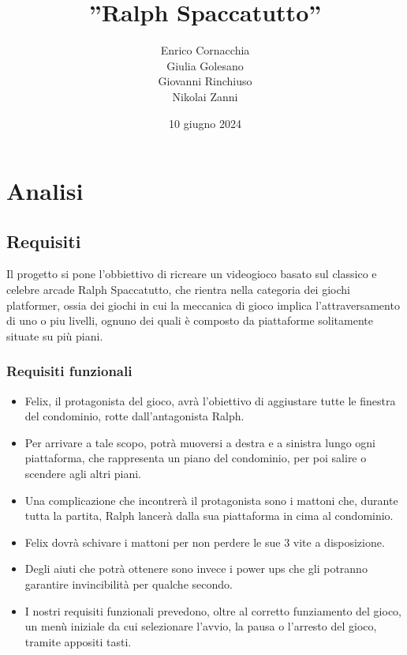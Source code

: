 \documentclass[a4paper,12pt]{report}
\title{''Ralph Spaccatutto''}
\author{Enrico Cornacchia \\ Giulia Golesano \\ Giovanni Rinchiuso \\ Nikolai Zanni}
\date{10 giugno 2024}
\begin{document}
\maketitle

\tableofcontents

\chapter{Analisi}

\section{Requisiti}

Il progetto si pone l'obbiettivo di ricreare un videogioco basato sul classico e celebre arcade Ralph Spaccatutto, che rientra nella categoria dei giochi platformer, ossia dei giochi in cui la meccanica di gioco implica l'attraversamento di uno o piu livelli, ognuno dei quali è composto da piattaforme solitamente situate su più piani.

\subsection{Requisiti funzionali}

\begin{itemize}

	\item Felix, il protagonista del gioco, avrà l'obiettivo di aggiustare tutte le finestra del condominio, rotte dall'antagonista Ralph. 
	\item Per arrivare a tale scopo, potrà muoversi a destra e a sinistra lungo ogni piattaforma, che rappresenta un piano del condominio, per poi salire o scendere agli altri piani.
	\item Una complicazione che incontrerà il protagonista sono i mattoni che, durante tutta la partita, Ralph lancerà dalla sua piattaforma in cima al condominio.
 \item Felix  dovrà schivare i mattoni per non perdere le sue 3 vite a disposizione.
	\item Degli aiuti che potrà ottenere sono invece i power ups che gli potranno garantire invincibilità per qualche secondo.
	\item I nostri requisiti funzionali prevedono, oltre al corretto funziamento del gioco, un menù iniziale da cui selezionare l'avvio, la pausa o l'arresto del gioco, tramite appositi tasti.
\end{itemize}
\end{document}
